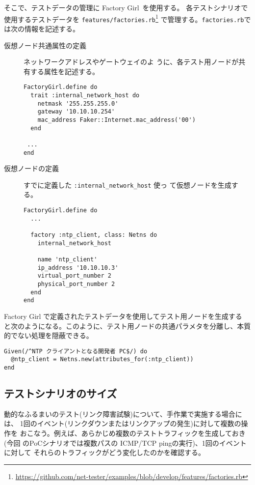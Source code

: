 そこで、テストデータの管理に Factory Girl~\cite{factory-girl}を使用する。
各テストシナリオで使用するテストデータを
\verb|features/factories.rb|\footnote{\url{https://github.com/net-tester/examples/blob/develop/features/factories.rb}}
で管理する。\verb|factories.rb|では次の情報を記述する。
\begin{description}
 \item[仮想ノード共通属性の定義] ネットワークアドレスやゲートウェイのよ
            うに、各テスト用ノードが共有する属性を記述する。
\begin{lstlisting}
FactoryGirl.define do
  trait :internal_network_host do
    netmask '255.255.255.0'
    gateway '10.10.10.254'
    mac_address Faker::Internet.mac_address('00')
  end

 ...
end
\end{lstlisting}
 \item[仮想ノードの定義] すでに定義した \verb|:internal_network_host| 使っ
            て仮想ノードを生成する。
\begin{lstlisting}
FactoryGirl.define do
  ...

  factory :ntp_client, class: Netns do
    internal_network_host

    name 'ntp_client'
    ip_address '10.10.10.3'
    virtual_port_number 2
    physical_port_number 2
  end
end
\end{lstlisting}
\end{description}

Factory Girl で定義されたテストデータを使用してテスト用ノードを生成する
と次のようになる。このように、テスト用ノードの共通パラメタを分離し、本質
的でない処理を隠蔽できる。
\begin{lstlisting}
Given(/^NTP クライアントとなる開発者 PC$/) do
  @ntp_client = Netns.new(attributes_for(:ntp_client))
end
\end{lstlisting}

  \subsection{テストシナリオのサイズ}


動的なふるまいのテスト(リンク障害試験)について、手作業で実施する場合には、
1回のイベント(リンクダウンまたはリンクアップの発生)に対して複数の操作を
おこなう。例えば、あらかじめ複数のテストトラフィックを生成しておき(今回
のPoCシナリオでは複数パスの ICMP/TCP pingの実行)、1回のイベントに対して
それらのトラフィックがどう変化したのかを確認する。

